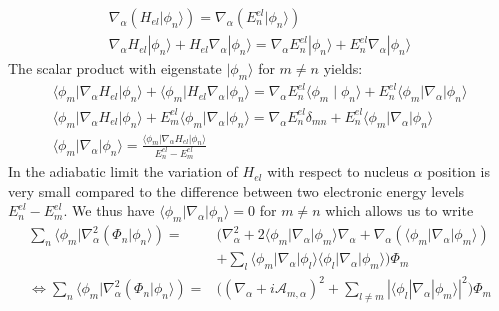 \documentclass[11pt,a4paper]{article}
\begin{document}
\begin{equation*}
	\begin{gathered}
		\nabla_\alpha (H_{el} |\phi_n\rangle) = \nabla_\alpha (E_n^{el} |\phi_n\rangle) \\[6pt]
		\nabla_\alpha H_{el} |\phi_n\rangle + H_{el} \nabla_\alpha |\phi_n\rangle = \nabla_\alpha E_n^{el} |\phi_n\rangle + E_n^{el} \nabla_\alpha |\phi_n\rangle
	\end{gathered}
\end{equation*}
The scalar product with eigenstate $|\phi_m\rangle$ for $m \neq n$ yields:
\begin{equation*}
	\begin{gathered}
		\langle\phi_m | \nabla_\alpha H_{el} |\phi_n\rangle + \langle\phi_m | H_{el} \nabla_\alpha |\phi_n\rangle = \nabla_\alpha E_n^{el} \langle\phi_m \mid \phi_n\rangle + E_n^{el} \langle\phi_m | \nabla_\alpha |\phi_n\rangle \\[6pt]
		\langle\phi_m | \nabla_\alpha H_{el} |\phi_n\rangle + E_m^{el} \langle\phi_m | \nabla_\alpha |\phi_n\rangle = \nabla_\alpha E_n^{el} \delta_{mn} + E_n^{el} \langle\phi_m | \nabla_\alpha |\phi_n\rangle \\[6pt]
		\langle\phi_m | \nabla_\alpha |\phi_n\rangle = \frac{\langle\phi_m | \nabla_\alpha H_{el} |\phi_n\rangle}{E_n^{el} - E_m^{el}}
	\end{gathered}
\end{equation*}
In the adiabatic limit the variation of $H_{el}$ with respect to nucleus $\alpha$ position is very small compared to the difference between two electronic energy levels $E_n^{el}-E_m^{el}$. We thus have $\langle\phi_m | \nabla_\alpha |\phi_n\rangle = 0$ for $m \neq n$ which allows us to write
\begin{equation*}
	\begin{split}
		\sum_n \langle\phi_m | \nabla_\alpha^2 (\Phi_n |\phi_n\rangle) = & \Big( \nabla_\alpha^2 + 2\langle\phi_m | \nabla_\alpha | \phi_m\rangle \nabla_\alpha + \nabla_\alpha(\langle\phi_m | \nabla_\alpha | \phi_m\rangle) \\
		& + \sum_l \langle\phi_m | \nabla_\alpha | \phi_l\rangle \langle\phi_l | \nabla_\alpha | \phi_m\rangle \Big) \Phi_m \\[6pt]
		\Leftrightarrow \sum_n \langle\phi_m | \nabla_\alpha^2 (\Phi_n |\phi_n\rangle) = & \Big( (\nabla_\alpha + i\boldsymbol{\mathcal{A}}_{m,\alpha})^2 + \sum_{l \neq m} |\langle\phi_l | \nabla_\alpha | \phi_m\rangle|^2 \Big) \Phi_m
	\end{split}
\end{equation*}
\end{document}
